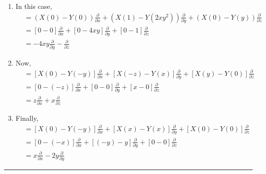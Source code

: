 \documentclass{article}
\begin{document}
\begin{enumerate}[label=(\alph*)]
  \item In this case, 
  \begin{align*}
    [X, Y] &= \left( X(0) - Y(0) \right) \frac{\partial }{ \partial x} + \left( X(1) - Y(2xy^2) \right) \frac{\partial }{ \partial y} + \left( X(0) - Y(y) \right) \frac{\partial }{ \partial z} \\
    &= \left[0 - 0 \right] \frac{\partial }{ \partial x} + \left[0 - 4xy \right] \frac{\partial }{ \partial y} + \left[0 - 1 \right] \frac{\partial }{ \partial z} \\
    &= -4xy \frac{\partial}{\partial y} - \frac{\partial}{\partial z} 
  \end{align*}

  \vskip 0.5cm
  \item Now, 
  \begin{align*}
    [X, Y] &= \left[X(0) - Y(-y) \right] \frac{\partial }{ \partial x} + \left[X (-z) - Y (x) \right] \frac{\partial }{ \partial y} + \left[X(y) - Y(0) \right] \frac{\partial }{ \partial z} \\
    &= \left[0 - (-z) \right] \frac{\partial }{ \partial x} + \left[0 - 0 \right] \frac{\partial }{ \partial y} + \left[x - 0 \right] \frac{\partial }{ \partial z} \\
    &= z \frac{\partial}{\partial x} + x \frac{\partial}{\partial z}
  \end{align*}

  \vskip 0.5cm
  \item Finally, 
  \begin{align*}
    [X, Y] &= \left[X (0) - Y (-y) \right] \frac{\partial }{ \partial x} + \left[X (x) - Y (x) \right] \frac{\partial }{ \partial y} + \left[X (0) - Y (0) \right] \frac{\partial }{ \partial z} \\
    &= \left[0 - (-x) \right] \frac{\partial }{ \partial x} + \left[(-y) - y \right] \frac{\partial }{ \partial y} + \left[0 - 0 \right] \frac{\partial }{ \partial z} \\
    &= x\frac{\partial}{\partial x} - 2y \frac{\partial}{\partial y}
  \end{align*}
\end{enumerate}


\vskip 0.5cm
\hrule 
\vskip 0.5cm
\end{document}
